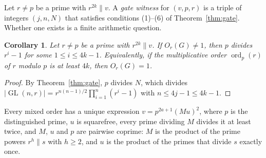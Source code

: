 \documentclass[11pt]{amsart}
\newtheorem{corollary}[theorem]{Corollary}
\theoremstyle{definition}
\theoremstyle{remark}
\newcommand{\GL}{\operatorname{GL}}
\begin{document}
Let $r\ne p$ be a prime with $r^{2k}\parallel v$. A \emph{gate witness} for $(v,p,r)$ is a triple of integers $(j,n,N)$ that satisfies conditions (1)--(6) of Theorem~\ref{thm:gate}. Whether one exists is a finite arithmetic question.

\begin{corollary}\label{cor:ord}
Let $r\ne p$ be a prime with $r^{2k}\parallel v$. If $O_r(G)\ne1$, then $p$ divides $r^i-1$ for some $1\le i\le4k-1$. Equivalently, if the multiplicative order $\operatorname{ord}_p(r)$ of $r$ modulo $p$ is at least $4k$, then $O_r(G)=1$.
\end{corollary}
\begin{proof}
By Theorem~\ref{thm:gate}, $p$ divides $N$, which divides $|\GL(n,r)|=r^{n(n-1)/2}\prod_{i=1}^n(r^i-1)$ with $n\le4j-1\le4k-1$.
\end{proof}

Every mixed order has a unique expression $v=p^{2a+1}(Mu)^2$, where $p$ is the distinguished prime, $u$ is squarefree, every prime dividing $M$ divides it at least twice, and $M$, $u$ and $p$ are pairwise coprime: $M$ is the product of the prime powers $r^h\parallel s$ with $h\ge2$, and $u$ is the product of the primes that divide $s$ exactly once.
\end{document}
